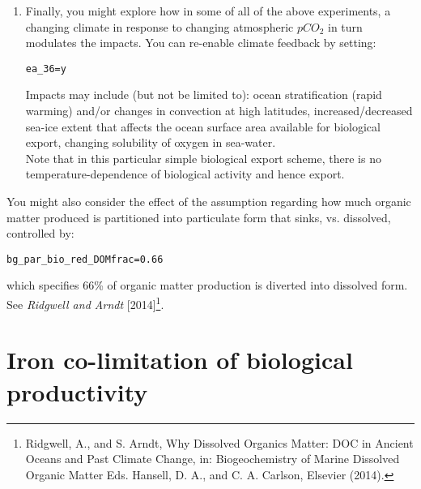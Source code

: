 \documentclass[11pt,fleqn]{book} %
\begin{document}
\begin{enumerate}[noitemsep]
\vspace{1mm}
\item Finally, you might explore how in some of all of the above experiments,  a changing climate in response to changing atmospheric \(pCO_{2}\) in turn modulates the impacts. You can re-enable climate feedback by setting:
\vspace{-2pt}\begin{verbatim}
ea_36=y
\end{verbatim}\vspace{-2pt}
Impacts may include (but not be limited to): ocean stratification (rapid warming) and/or changes in convection at high latitudes, increased/decreased sea-ice extent that affects the ocean surface area available for biological export, changing solubility of oxygen in sea-water.
\\Note that in this particular simple biological export scheme, there is no temperature-dependence of biological activity and hence export.

\end{enumerate}
\vspace{1mm}

You might also consider the effect of the assumption regarding how much organic matter produced is partitioned into particulate form that sinks, vs. dissolved, controlled by:
\vspace{-2pt}\begin{verbatim}
bg_par_bio_red_DOMfrac=0.66
\end{verbatim}\vspace{-2pt}
which specifies 66\% of organic matter production is diverted into dissolved form. See \textit{Ridgwell and Arndt} [2014]\footnote{Ridgwell, A., and S. Arndt, Why Dissolved Organics Matter: DOC in Ancient Oceans and Past Climate Change, in: Biogeochemistry of Marine Dissolved Organic Matter Eds. Hansell, D. A., and C. A. Carlson, Elsevier (2014).}.


\newpage


\section{Iron co-limitation of biological productivity}




\end{document}
